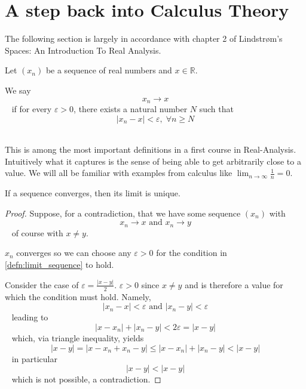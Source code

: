 \newpage 
\section{A step back into Calculus Theory}
The following section is largely in accordance with 
chapter 2 of Lindstrøm's Spaces: An Introduction 
To Real Analysis. 

\begin{defn}
    \label{defn:limit_sequence}
    Let $(x_n)$ be a sequence of real numbers and $x \in \mathbb R$. 

    We say 
    $$ 
        x_n \to x
    $$ 
    if for every $\varepsilon > 0$, there exists a natural number 
    $N$ such that 
    $$ 
        |x_n - x| < \varepsilon, \; \forall n \geq N
    $$ 
\end{defn}
This is among the most important definitions in a first 
course in Real-Analysis.   
Intuitively what it captures is the sense of being able 
to get arbitrarily close to a value. 
We will all be familiar with examples from 
calculus like $\lim_{n\to\infty} \frac{1}{n} = 0$. 

\begin{thm}
    \label{thm:limit_unique}
    If a sequence converges, then its limit is unique. 
\end{thm}
\begin{proof}
    Suppose, for a contradiction, that we have some sequence 
    $(x_n)$ with 
    $$ 
        x_n \to x \text{ and } x_n \to y
    $$ 
    of course with $x \neq y$.

    $x_n$ converges so we can choose any $\varepsilon > 0$ 
    for the condition in \cref{defn:limit_sequence} to hold. 

    Consider the case of $\varepsilon = \frac{|x-y|}{2}$. 
    $\varepsilon > 0$ since $x \neq y$ and is therefore a value 
    for which the condition must hold. Namely, 
    $$ 
        |x_n - x| < \varepsilon \text{ and } |x_n - y| < \varepsilon
    $$ 
    leading to
    $$ 
        |x - x_n| + |x_n - y| < 2\varepsilon = |x - y|
    $$ 
    which, via triangle inequality, yields 
    $$ 
        |x-y| = |x - x_n + x_n - y| \leq |x - x_n| + |x_n - y| < |x-y| 
    $$ 
    in particular 
    $$ 
        |x-y| < |x-y|
    $$ 
    which is not possible, a contradiction. 

\end{proof}


